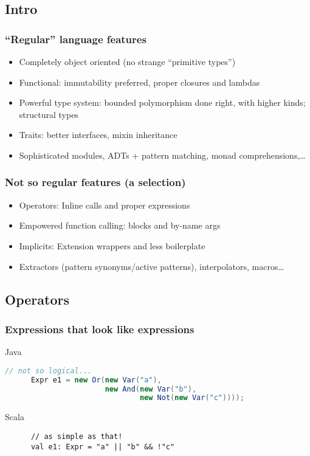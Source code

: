 \documentclass{beamer}
\begin{document}
\subsection{Intro}

\begin{frame}
  \frametitle{\enquote{Regular} language features}
  \begin{itemize}
  \item Completely object oriented (no strange \enquote{primitive types})
  \item Functional: immutability preferred, proper closures and lambdas
  \item Powerful type system: bounded polymorphism done right, with higher kinds; structural types
  \item Traits: better interfaces, mixin inheritance
  \item Sophisticated modules, ADTs + pattern matching, monad comprehensions,\ldots
  \end{itemize}
\end{frame}

\begin{frame}
  \frametitle{Not so regular features (a selection)}
  \begin{itemize}
  \item Operators: Inline calls and proper expressions
  \item Empowered function calling: blocks and by-name args
  \item Implicits: Extension wrappers and less boilerplate
  \item Extractors (pattern synonyms/active patterns), interpolators, macros\ldots
  \end{itemize}
\end{frame}


\subsection{Operators}

\begin{frame}[containsverbatim]
  \lstset{gobble=6}
  \frametitle{Expressions that look like expressions}
  \begin{block}{Java}
    \begin{lstlisting}[language=Java]
      // not so logical...
      Expr e1 = new Or(new Var("a"), 
                       new And(new Var("b"), 
                               new Not(new Var("c"))));
    \end{lstlisting}
  \end{block}
  \begin{block}{Scala}
    \begin{lstlisting}
      // as simple as that!
      val e1: Expr = "a" || "b" && !"c"
    \end{lstlisting}
  \end{block}
\end{frame}
\end{document}
